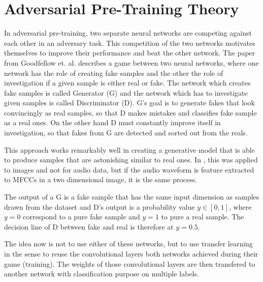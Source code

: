 
\section{Adversarial Pre-Training Theory}\label{sec:nn_adv}
\thesisStateNotReady
In adversarial pre-training, two separate neural networks are competing against each other in an adversary task.
This competition of the two networks motivates themselves to improve their performance and beat the other network.
The paper from Goodfellow et. al. \cite{Goodfellow2014} describes a game between two neural networks, where one network has the role of creating fake samples and the other the role of investigation if a given sample is either real or fake.
The network which creates fake samples is called Generator (G) and the network which has to investigate given samples is called Discriminator (D).
G's goal is to generate fakes that look convincingly as real samples, so that D makes mistakes and classifies fake sample as a real ones.
On the other hand D must constantly improve itself in investigation, so that fakes from G are detected and sorted out from the reals.

This approach works remarkably well in creating a generative model that is able to produce samples that are astonishing similar to real ones.
In \cite{Goodfellow2014}, this was applied to images and not for audio data, but if the audio waveform is feature extracted to MFCCs in a two dimensional image, it is the same process.

The output of a G is a fake sample that has the same input dimension as samples drawn from the dataset and D's output is a probability value $y \in [0, 1]$, where $y = 0$ correspond to a pure fake sample and $y = 1$ to pure a real sample.
The decision line of D between fake and real is therefore at $y = 0.5$.

The idea now is not to use either of these networks, but to use transfer learning in the sense to reuse the convolutional layers both networks achieved during their game (training).
The weights of those convolutional layers are then transfered to another network with classification purpose on multiple labels.


